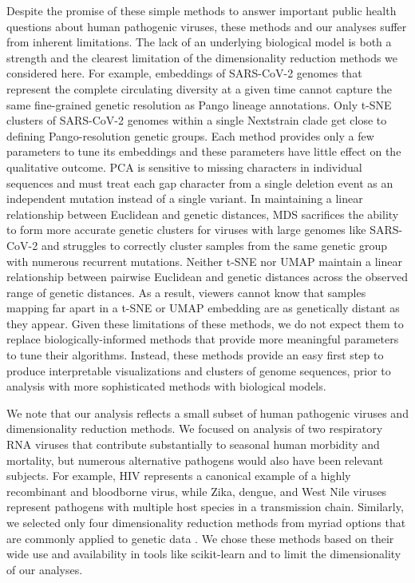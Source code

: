 \documentclass[webpdf,contemporary,large,single]{oup-authoring-template}%
\theoremstyle{thmstyleone}%
\theoremstyle{thmstyletwo}%
\theoremstyle{thmstylethree}%
\begin{document}
Despite the promise of these simple methods to answer important public health questions about human pathogenic viruses, these methods and our analyses suffer from inherent limitations.
The lack of an underlying biological model is both a strength and the clearest limitation of the dimensionality reduction methods we considered here.
For example, embeddings of SARS-CoV-2 genomes that represent the complete circulating diversity at a given time cannot capture the same fine-grained genetic resolution as Pango lineage annotations.
Only t-SNE clusters of SARS-CoV-2 genomes within a single Nextstrain clade get close to defining Pango-resolution genetic groups.
Each method provides only a few parameters to tune its embeddings and these parameters have little effect on the qualitative outcome.
PCA is sensitive to missing characters in individual sequences and must treat each gap character from a single deletion event as an independent mutation instead of a single variant.
In maintaining a linear relationship between Euclidean and genetic distances, MDS sacrifices the ability to form more accurate genetic clusters for viruses with large genomes like SARS-CoV-2 and struggles to correctly cluster samples from the same genetic group with numerous recurrent mutations.
Neither t-SNE nor UMAP maintain a linear relationship between pairwise Euclidean and genetic distances across the observed range of genetic distances.
As a result, viewers cannot know that samples mapping far apart in a t-SNE or UMAP embedding are as genetically distant as they appear.
Given these limitations of these methods, we do not expect them to replace biologically-informed methods that provide more meaningful parameters to tune their algorithms.
Instead, these methods provide an easy first step to produce interpretable visualizations and clusters of genome sequences, prior to analysis with more sophisticated methods with biological models.

We note that our analysis reflects a small subset of human pathogenic viruses and dimensionality reduction methods.
We focused on analysis of two respiratory RNA viruses that contribute substantially to seasonal human morbidity and mortality, but numerous alternative pathogens would also have been relevant subjects.
For example, HIV represents a canonical example of a highly recombinant and bloodborne virus, while Zika, dengue, and West Nile viruses represent pathogens with multiple host species in a transmission chain.
Similarly, we selected only four dimensionality reduction methods from myriad options that are commonly applied to genetic data \citep{Armstrong2022}.
We chose these methods based on their wide use and availability in tools like scikit-learn \citep{Pedregosa2011} and to limit the dimensionality of our analyses.
\end{document}

